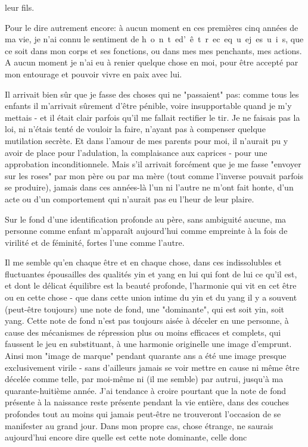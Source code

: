 

leur fils.

Pour le dire autrement encore: à aucun moment en ces premières\unsure{,} cinq années de ma vie, je n'ai connu le sentiment de \mbox{h o n t e}\quad\mbox{d' ê t r e}\quad\mbox{c e}\quad\mbox{q u e}\quad\mbox{j e}\quad\mbox{s u i s}, que ce soit dans mon corps et ses fonctions, ou dans mes  mes penchants, mes actions. A aucun moment je n'ai eu à renier quelque chose en moi, pour être accepté par mon entourage et pouvoir vivre en paix avec lui.

Il arrivait bien sûr que je fasse des choses qui ne "passaient" pas: comme tous les enfants il m'arrivait sûrement d'être pénible, voire insupportable quand je m'y mettais - et il était clair parfois qu'il me fallait rectifier le tir. Je ne faisais pas la loi, ni n'étais tenté de vouloir la faire, n'ayant pas à compenser quelque mutilation secrète. Et dans l'amour de mes parents pour moi, il n'aurait pu y avoir de place pour l'adulation, la complaisance aux caprices - pour une approbation inconditionnele. Mais s'il arrivait forcément que je me fasse "envoyer sur les roses" par mon père ou par ma mère (tout comme l'inverse pouvait parfois se produire), jamais dans ces années-là l'un ni l'autre ne m'ont fait honte, d'un acte ou d'un comportement qui n'aurait pas eu l'heur de leur plaire.

Sur le fond d'une identification profonde au père, sans ambiguité aucune, ma personne comme enfant m'apparaît aujourd'hui comme empreinte à la fois de virilité et de féminité, fortes l'une comme l'autre.

Il me semble qu'en chaque être et en chaque chose, dans ces indissolubles et fluctuantes épousailles des qualités yin et yang en lui qui font de lui ce qu'il est, et dont le délicat équilibre est la beauté profonde, l'harmonie qui vit en cet être ou en cette chose - que dans cette union intime du yin et du yang il y a souvent (peut-être toujours) une note de fond, une "dominante", qui est soit yin, soit yang. Cette note de fond n'est pas toujours aisée à déceler en une personne, à cause des mécanismes de répression plus ou moins efficaces et complets, qui faussent le jeu en substituant, à une harmonie originelle une image d'emprunt. Ainsi mon "image de marque" pendant quarante ans a été une image presque exclusivement virile - sans d'ailleurs jamais se voir mettre en cause ni même être décelée comme telle, par moi-même ni (il me semble) par autrui, jusqu'à ma quarante-huitième année. J'ai tendance à croire pourtant que la note de fond présente à la naissance reste présente pendant la vie entière, dans des couches profondes tout au moins qui jamais peut-être ne trouveront l'occasion de se manifester au grand jour. Dans mon propre cas, chose étrange,  ne saurais aujourd'hui encore dire quelle est cette note dominante, celle donc

